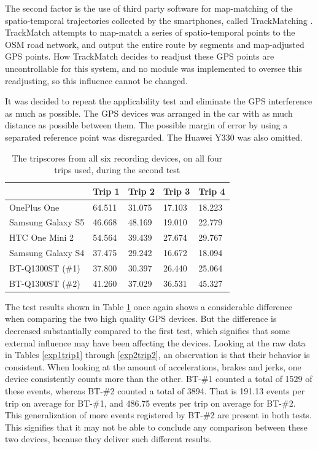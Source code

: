 The second factor is the use of third party software for map-matching of the spatio-temporal trajectories collected by the smartphones, called TrackMatching \citep{trackmatch}. TrackMatch attempts to map-match a series of spatio-temporal points to the OSM road network, and output the entire route by segments and map-adjusted GPS points. How TrackMatch decides to readjust these GPS points are uncontrollable for this system, and no module was implemented to oversee this readjusting, so this influence cannot be changed.

It was decided to repeat the applicability test and eliminate the GPS interference as much as possible. The GPS devices was arranged in the car with as much distance as possible between them. The possible margin of error by using a separated reference point was disregarded. The Huawei Y330 was also omitted. 

\begin{table}[tb]
\centering
\caption{The tripscores from all six recording devices, on all four trips used, during the second test}
\label{tab:smartphone_test_two}
\begin{tabular}{|l|llll|}
\hline
\rowcolor{tablegreen}

                   & \textbf{Trip 1}    & \textbf{Trip 2}    & \textbf{Trip 3}    & \textbf{Trip 4}  \\\hline
OnePlus One        & 64.511  & 31.075  & 17.103  & 18.223 \\
Samsung Galaxy S5  & 46.668  & 48.169  & 19.010  & 22.779 \\
HTC One Mini 2     & 54.564  & 39.439  & 27.674  & 29.767 \\
Samsung Galaxy S4  & 37.475  & 29.242  & 16.672  & 18.094 \\
BT-Q1300ST (\#1)   & 37.800  & 30.397  & 26.440  & 25.064 \\
BT-Q1300ST (\#2)   & 41.260  & 37.029  & 36.531  & 45.327 \\\hline

\end{tabular}
\end{table}

The test results shown in Table \ref{tab:smartphone_test_two} once again shows a considerable difference when comparing the two high quality GPS devices. But the difference is decreased substantially compared to the first test, which signifies that some external influence may have been affecting the devices. Looking at the raw data in Tables \ref{exp1trip1} through \ref{exp2trip2}, an observation is that their behavior is consistent. When looking at the amount of accelerations, brakes and jerks, one device consistently counts more than the other. BT-\#1 counted a total of 1529 of these events, whereas BT-\#2 counted a total of 3894. That is 191.13 events per trip on average for BT-\#1, and 486.75 events per trip on average for BT-\#2. This generalization of more events registered by BT-\#2 are present in both tests. This signifies that it may not be able to conclude any comparison between these two devices, because they deliver such different results.

